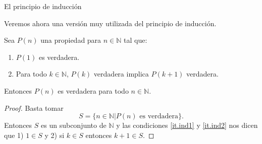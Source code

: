 \begin{section}{El principio de inducción}
\begin{comment}
    \begin{teorema}[Principio de inducción]\label{teorema-principio-de-induccion} Supongamos que $S$ es un subconjunto de $\mathbb N$ que satisface las condiciones \index{principio de inducción}
    \begin{enumerate}[label=\textit{\alph*)}]
    \item\label{caso-base} $1 \in S$,
    \item\label{paso-inductivo} para cada $k \in \mathbb N$, si $ k \in S$ entonces $k+1\in S$.
    \end{enumerate}
    Entonces se sigue que $S=\mathbb N$.
    \end{teorema}
    \begin{proof}Si la conclusión es falsa, $S \not= \mathbb N$ y
    el conjunto complementario $S^{\text{c}}$ definido por
    $$
    S^{\text{c}}= \{ r \in \mathbb N | r\not\in S\}
    $$
    es no vacío. Por el axioma del buen orden, $S^{\text{c}}$ tiene un menor elemento $m$. Como por \ref{caso-base} el $1$ pertenece a $S$, $m\not=1$. Se sigue que $m-1$ pertenece a $\mathbb N$ y como $m$ es el mínimo de $S^{\text{c}}$, $m-1$ debe pertenecer a $S$. Poniendo $k=m-1$ en la condición \ref{paso-inductivo}, concluimos que $m$ esta en $S$, lo cual contradice el hecho de que $m$ pertenece a $S^{\text{c}}$. De este modo, la suposición $S \not= \mathbb N$ nos lleva a un absurdo, y por lo tanto tenemos $S= \mathbb N$. 
    \end{proof}
\end{comment}

Veremos ahora una versión muy utilizada del principio de inducción.

\begin{teorema}\label{teorema-principio-de-induccion} Sea $P(n)$ una propiedad para $n \in \mathbb N$ tal que:
    \begin{enumerate}[label=\textit{\alph*)}]
    \item\label{it.ind1} $P(1)$ es verdadera.
    \item\label{it.ind2} Para todo $k \in \mathbb N$, $P(k)$ verdadera implica $P(k + 1)$ verdadera.
    \end{enumerate}
    Entonces $P(n)$ es verdadera para todo $n \in \mathbb N$.
    \end{teorema}
    \begin{proof} Basta tomar
    $$S = \{n \in \mathbb N| P(n) \text{ es verdadera} \}.$$
    Entonces $S$ es un subconjunto de $\mathbb N$ y las condiciones \ref{it.ind1} y \ref{it.ind2} nos dicen que 1) $1 \in S$ y   2) si $ k \in S$ entonces $k+1\in S$. 
    

\end{proof}
\end{section}
